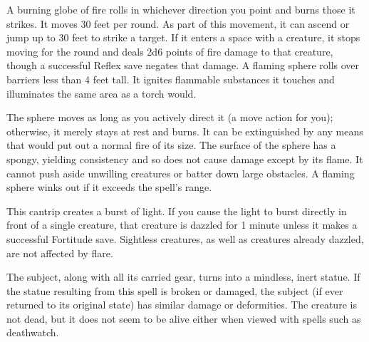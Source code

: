 \begin{multicols}{2}
\begin{small}
\noindent A burning globe of fire rolls in whichever direction you point and burns those it strikes. It moves 30 feet per round. As part of this movement, it can ascend or jump up to 30 feet to strike a target. If it enters a space with a creature, it stops moving for the round and deals 2d6 points of fire damage to that creature, though a successful Reflex save negates that damage. A flaming sphere rolls over barriers less than 4 feet tall. It ignites flammable substances it touches and illuminates the same area as a torch would.

\smallskip\noindent The sphere moves as long as you actively direct it (a move action for you); otherwise, it merely stays at rest and burns. It can be extinguished by any means that would put out a normal fire of its size. The surface of the sphere has a spongy, yielding consistency and so does not cause damage except by its flame. It cannot push aside unwilling creatures or batter down large obstacles. A flaming sphere winks out if it exceeds the spell's range.


\noindent This cantrip creates a burst of light. If you cause the light to burst directly in front of a single creature, that creature is dazzled for 1 minute unless it makes a successful Fortitude save. Sightless creatures, as well as creatures already dazzled, are not affected by flare.

\noindent The subject, along with all its carried gear, turns into a mindless, inert statue. If the statue resulting from this spell is broken or damaged, the subject (if ever returned to its original state) has similar damage or deformities. The creature is not dead, but it does not seem to be alive either when viewed with spells such as deathwatch.


\end{small}
\end{multicols}
